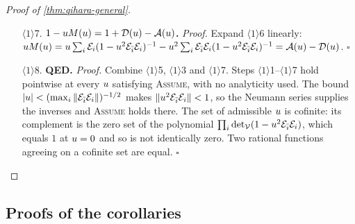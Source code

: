 \begin{proof}[Proof of \cref{thm:qihara-general}]
\begin{enumerate}
$(P-BQ)v$ at $i$ and $(-CP+Q)v$ at $\bari{i}$. Applying $\Rmap$, which applies $\Eop{i}$ to the component at $i$, $\Eop{\bari{i}}$ to the
component at $\bari{i}$, and sums over all indices, and substituting $B,C,P,Q$, the pair $p$ contributes
\[
  \Eop{i}P-\uz\,\Eop{i}\Eop{\bari{i}}Q \;+\; \Eop{\bari{i}}Q-\uz\,\Eop{\bari{i}}\Eop{i}P
  \;=\; (\Eop{i}-\uz\Eop{\bari{i}}\Eop{i})P \;+\; (\Eop{\bari{i}}-\uz\Eop{i}\Eop{\bari{i}})Q .
\]
The first summand is the $i$-th term of the claimed sum and the second is the $\bari{i}$-th, since $Q =
(1-\uz^2\Eop{\bari{\bari{i}}}\Eop{\bari{i}})^{-1}$. Summing over the $\mpairs$ pairs gives the sum over all $\Dk$ indices. $\square$
\item[$\langle1\rangle$7.] \textbf{$1-u M(u) = 1+\mathcal D(u)-\mathcal A(u)$.} \emph{Proof.} Expand $\langle1\rangle$6 linearly: $u M(u) =
u\sum_i\mathcal E_{i}(1-u^2\mathcal E_{\bar{i}}\mathcal E_{i})^{-1} - u^2\sum_i\mathcal E_{\bar{i}}\mathcal E_{i}(1-u^2\mathcal E_{\bar{i}}\mathcal E_{i})^{-1} = \mathcal A(u)-\mathcal D(u)$.
$\square$
\item[$\langle1\rangle$8.] \textbf{QED.} \emph{Proof.} Combine $\langle1\rangle$5, $\langle1\rangle$3 and $\langle1\rangle$7. Steps
$\langle1\rangle$1--$\langle1\rangle$7 hold pointwise at every $u$ satisfying \textsc{Assume}, with no analyticity used. The bound $|u|
< (\max_i\|\mathcal E_{\bar{i}}\mathcal E_{i}\|)^{-1/2}$ makes $\|u^2\mathcal E_{\bar{i}}\mathcal E_{i}\| < 1$, so the Neumann series supplies the inverses and
\textsc{Assume} holds there. The set of admissible $u$ is cofinite: its complement is the zero set of the polynomial
$\prod_i\det\nolimits_{\mathcal V}(1-u^2\mathcal E_{\bar{i}}\mathcal E_{i})$, which equals $1$ at $u = 0$ and so is not identically zero. Two rational
functions agreeing on a cofinite set are equal. $\square$
\end{enumerate}
\end{proof}

\subsection{Proofs of the corollaries}

